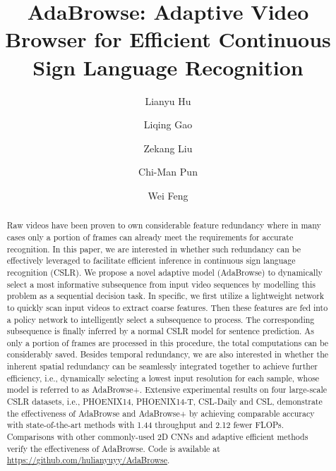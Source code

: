 \documentclass[sigconf]{acmart}
\begin{document}
\title{AdaBrowse: Adaptive Video Browser for Efficient Continuous Sign Language Recognition}



\author{Lianyu Hu}


\author{Liqing Gao}

\author{Zekang Liu}

\author{Chi-Man Pun}

\author{Wei Feng}
\renewcommand{\shortauthors}{Lianyu Hu, Liqing Gao, Zekang Liu, Chi-Man Pun, Wei Feng}

\begin{abstract}
Raw videos have been proven to own considerable feature redundancy where in many cases only a portion of frames can already meet the requirements for accurate recognition. In this paper, we are interested in whether such redundancy can be effectively leveraged to facilitate efficient inference in continuous sign language recognition (CSLR). We propose a novel adaptive model (AdaBrowse) to dynamically select a most informative subsequence from input video sequences by modelling this problem as a sequential decision task. In specific, we first utilize a lightweight network to quickly scan input videos to extract coarse features. Then these features are fed into a policy network to intelligently select a subsequence to process. The corresponding subsequence is finally inferred by a normal CSLR model for sentence prediction. As only a portion of frames are processed in this procedure, the total computations can be considerably saved. Besides temporal redundancy, we are also interested in whether the inherent spatial redundancy can be seamlessly integrated together to achieve further efficiency, i.e., dynamically selecting a lowest input resolution for each sample, whose model is referred to as AdaBrowse+. Extensive experimental results on four large-scale CSLR datasets, i.e., PHOENIX14, PHOENIX14-T, CSL-Daily and CSL, demonstrate the effectiveness of AdaBrowse and AdaBrowse+ by achieving comparable accuracy with state-of-the-art methods with 1.44 throughput and 2.12 fewer FLOPs. Comparisons with other commonly-used 2D CNNs and adaptive efficient methods verify the effectiveness of AdaBrowse. Code is available at \url{https://github.com/hulianyuyy/AdaBrowse}.
\end{abstract}
\end{document}
